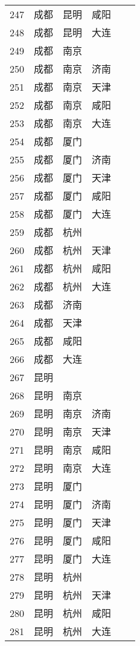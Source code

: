 \begin{footnotesize}
\begin{longtable}{cccccc}
        247	& 成都  & 昆明  & 咸阳 \\
        248	& 成都  & 昆明  & 大连 \\
        249	& 成都  & 南京 \\
        250	& 成都  & 南京  & 济南 \\
        251	& 成都  & 南京  & 天津 \\
        252	& 成都  & 南京  & 咸阳 \\
        253	& 成都  & 南京  & 大连 \\
        254	& 成都  & 厦门 \\
        255	& 成都  & 厦门  & 济南 \\
        256	& 成都  & 厦门  & 天津 \\
        257	& 成都  & 厦门  & 咸阳 \\
        258	& 成都  & 厦门  & 大连 \\
        259	& 成都  & 杭州 \\
        260	& 成都  & 杭州  & 天津 \\
        261	& 成都  & 杭州  & 咸阳 \\
        262	& 成都  & 杭州  & 大连 \\
        263	& 成都  & 济南 \\
        264	& 成都  & 天津 \\
        265	& 成都  & 咸阳 \\
        266	& 成都  & 大连 \\
        267	& 昆明 \\
        268	& 昆明  & 南京 \\
        269	& 昆明  & 南京  & 济南 \\
        270	& 昆明  & 南京  & 天津 \\
        271	& 昆明  & 南京  & 咸阳 \\
        272	& 昆明  & 南京  & 大连 \\
        273	& 昆明  & 厦门 \\
        274	& 昆明  & 厦门  & 济南 \\
        275	& 昆明  & 厦门  & 天津 \\
        276	& 昆明  & 厦门  & 咸阳 \\
        277	& 昆明  & 厦门  & 大连 \\
        278	& 昆明  & 杭州 \\
        279	& 昆明  & 杭州  & 天津 \\
        280	& 昆明  & 杭州  & 咸阳 \\
        281	& 昆明  & 杭州  & 大连 \\

\end{longtable}
\end{footnotesize}

